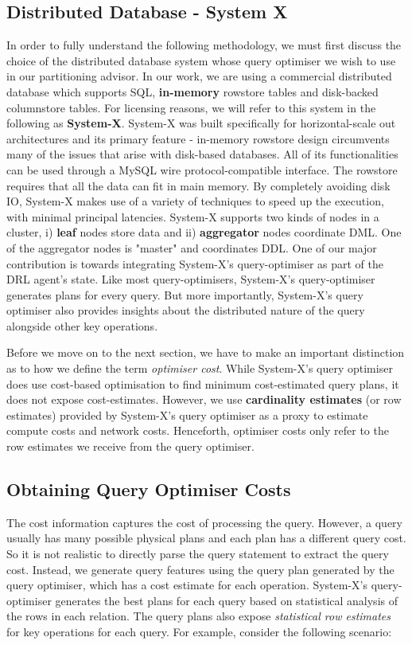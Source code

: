 \subsection{Distributed Database - System X}
\label{sec:system-x}
In order to fully understand the following methodology, we must first discuss the choice of the distributed database system whose query optimiser we wish to use in our partitioning advisor. In our work, we are using a commercial distributed database which supports SQL, \textbf{in-memory} rowstore tables and disk-backed columnstore tables. For licensing reasons, we will refer to this system in the following as \textbf{System-X}. System-X was built specifically for horizontal-scale out architectures and its primary feature - in-memory rowstore design circumvents many of the issues that arise with disk-based databases. All of its functionalities can be used through a MySQL wire protocol-compatible interface. The rowstore requires that all the data can fit in main memory. By completely avoiding disk IO, System-X makes use of a variety of techniques to speed up the execution, with minimal principal latencies. System-X supports two kinds of nodes in a cluster, i) \textbf{leaf} nodes store data and ii) \textbf{aggregator} nodes coordinate DML. One of the aggregator nodes is "master" and coordinates DDL. One of our major contribution is towards integrating System-X's query-optimiser as part of the DRL agent's state. Like most query-optimisers, System-X's query-optimiser generates plans for every query. But more importantly, System-X's query optimiser also provides insights about the distributed nature of the query alongside other key operations.

Before we move on to the next section, we have to make an important distinction as to how we define the term \textit{optimiser cost}. While System-X's query optimiser does use cost-based optimisation to find minimum cost-estimated query plans, it does not expose cost-estimates. However, we use \textbf{cardinality estimates} (or row estimates) provided by System-X's query optimiser as a proxy to estimate compute costs and network costs. Henceforth, optimiser costs only refer to the row estimates we receive from the query optimiser.

\subsection{Obtaining Query Optimiser Costs}
\label{sec:obt-query-opt-costs}
The cost information captures the cost of processing the query. However, a query usually has many possible physical plans and each plan has a different query cost. So it is not realistic to directly parse the query statement to extract the query cost. Instead, we generate query features using the query plan generated by the query optimiser, which has a cost estimate for each operation. System-X's query-optimiser generates the best plans for each query based on statistical analysis of the rows in each relation. The query plans also expose \textit{statistical row estimates} for key operations for each query. For example, consider the following scenario:

